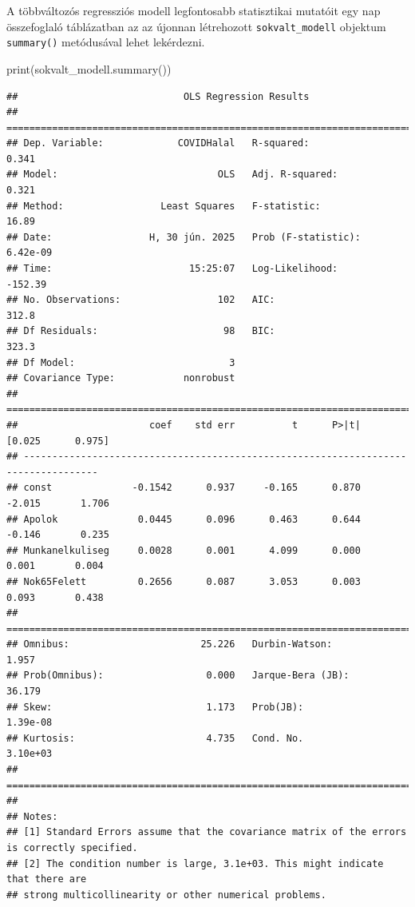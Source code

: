 \documentclass[
]{book}
\newenvironment{Shaded}{\begin{snugshade}}{\end{snugshade}}
\newcommand{\BuiltInTok}[1]{#1}
\newcommand{\NormalTok}[1]{#1}
\begin{document}
A többváltozós regressziós modell legfontosabb statisztikai mutatóit egy nap összefoglaló táblázatban az az újonnan létrehozott \texttt{sokvalt\_modell} objektum \texttt{summary()} metódusával lehet lekérdezni.

\begin{Shaded}
\begin{Highlighting}[]
\BuiltInTok{print}\NormalTok{(sokvalt\_modell.summary())}
\end{Highlighting}
\end{Shaded}

\begin{verbatim}
##                             OLS Regression Results                            
## ==============================================================================
## Dep. Variable:             COVIDHalal   R-squared:                       0.341
## Model:                            OLS   Adj. R-squared:                  0.321
## Method:                 Least Squares   F-statistic:                     16.89
## Date:                 H, 30 jún. 2025   Prob (F-statistic):           6.42e-09
## Time:                        15:25:07   Log-Likelihood:                -152.39
## No. Observations:                 102   AIC:                             312.8
## Df Residuals:                      98   BIC:                             323.3
## Df Model:                           3                                         
## Covariance Type:            nonrobust                                         
## ===================================================================================
##                       coef    std err          t      P>|t|      [0.025      0.975]
## -----------------------------------------------------------------------------------
## const              -0.1542      0.937     -0.165      0.870      -2.015       1.706
## Apolok              0.0445      0.096      0.463      0.644      -0.146       0.235
## Munkanelkuliseg     0.0028      0.001      4.099      0.000       0.001       0.004
## Nok65Felett         0.2656      0.087      3.053      0.003       0.093       0.438
## ==============================================================================
## Omnibus:                       25.226   Durbin-Watson:                   1.957
## Prob(Omnibus):                  0.000   Jarque-Bera (JB):               36.179
## Skew:                           1.173   Prob(JB):                     1.39e-08
## Kurtosis:                       4.735   Cond. No.                     3.10e+03
## ==============================================================================
## 
## Notes:
## [1] Standard Errors assume that the covariance matrix of the errors is correctly specified.
## [2] The condition number is large, 3.1e+03. This might indicate that there are
## strong multicollinearity or other numerical problems.
\end{verbatim}
\end{document}

